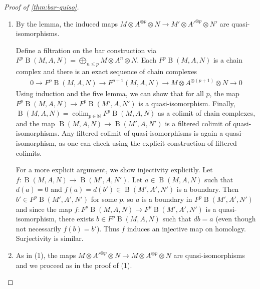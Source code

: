 \documentclass{scrartcl}
\theoremstyle{plain}
\newtheorem{theorem}{Theorem}[section]
\theoremstyle{definition}
\newcommand{\N}{\mathbb N}
\newcommand{\from}{\leftarrow}
\DeclareMathOperator{\colim}{colim}
\DeclareMathOperator{\BC}{B}
\newcommand{\comp}{\mathbin{\circ}}
\begin{document}
\begin{proof}[Proof of \cref{thm:bar-quiso}]
    \begin{enumerate}
        \item By the lemma, the induced maps $M\otimes A^{\otimes p}\otimes N \to M'\otimes A'^{\otimes p}\otimes N'$ are quasi-isomorphisms. 

Define a filtration on the bar construction via $F^p\BC(M, A, N) = \bigoplus_{n\leq p} M\otimes A^n\otimes N$. Each $F^p\BC(M, A, N)$ is a chain complex and there is an exact sequence of chain complexes
\begin{align*}
    0\to F^p\BC(M, A, N)\to F^{p+1}(M, A, N) \to M\otimes A^{\otimes(p+1)}\otimes N \to 0
\end{align*}
Using induction and the five lemma, we can show that for all $p$, the map $F^p\BC(M, A, N)\to F^p\BC(M', A, N')$ is a quasi-isomorphism. Finally, $\BC(M, A, N)=\colim_{p\in \N} F^p\BC(M, A, N)$ as a colimit of chain complexes, and the map $\BC(M, A, N)\to \BC(M', A, N')$ is a filtered colimit of quasi-isomorphisms. Any filtered colimit of quasi-isomorphisms is again a quasi-isomorphism, as one can check using the explicit construction of filtered colimits. 

For a more explicit argument, we show injectivity explicitly. Let $f\colon \BC(M, A, N)\to \BC(M', A, N')$. Let $a\in \BC(M, A, N)$ such that $d(a) = 0$ and $f(a)=d(b')\in \BC(M', A', N')$ is a boundary. Then $b'\in F^p\BC(M', A', N')$ for some $p$, so $a$ is a boundary in $F^p\BC(M', A', N')$ and since the map $f\colon F^p\BC(M, A, N)\to F^p\BC(M', A', N')$ is a quasi-isomorphism, there exists $b\in F^p\BC(M, A, N)$ such that $db = a$ (even though not necessarily $f(b) = b'$). Thus $f$ induces an injective map on homology. Surjectivity is similar. 
\item As in (1), the maps $M\otimes A'^{\otimes p}\otimes N\to M\otimes A^{\otimes p}\otimes N$ are quasi-isomorphisms and we proceed as in the proof of (1). 
\end{enumerate}
\end{proof}


\end{document}
